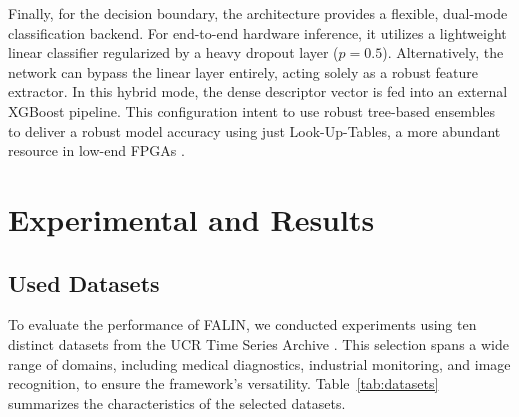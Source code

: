 \documentclass[10pt,conference]{IEEEtran}
\begin{document}
Finally, for the decision boundary, the architecture provides a flexible, dual-mode classification backend. For end-to-end hardware inference, it utilizes a lightweight linear classifier regularized by a heavy dropout layer ($p=0.5$). Alternatively, the network can bypass the linear layer entirely, acting solely as a robust feature extractor. In this hybrid mode, the dense descriptor vector is fed into an external XGBoost pipeline. This configuration intent to use robust tree-based ensembles to deliver a robust model accuracy using just Look-Up-Tables, a more abundant resource in low-end FPGAs \cite{https://doi.org/10.1002/cpe.70744, khataei2025treelut}.

\section{Experimental and Results}
\label{sec:results}


\subsection{Used Datasets}
\label{subsec:datasets}

To evaluate the performance of FALIN, we conducted experiments using ten distinct datasets from the UCR Time Series Archive \cite{8894743}. This selection spans a wide range of domains, including medical diagnostics, industrial monitoring, and image recognition, to ensure the framework's versatility. Table~\ref{tab:datasets} summarizes the characteristics of the selected datasets.

\begin{table}[htbp]
    \centering
    \caption{Summary of the Selected UCR Datasets}
    \label{tab:datasets}
\end{table}
\end{document}
